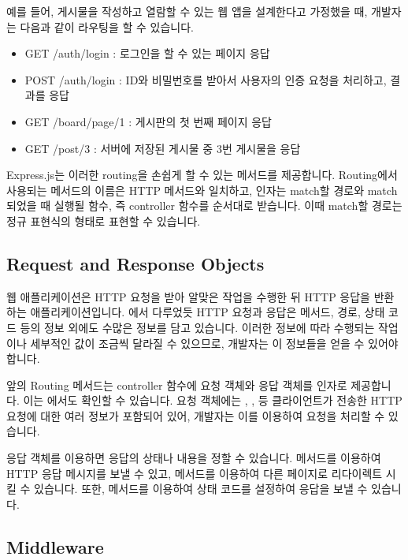 예를 들어, 게시물을 작성하고 열람할 수 있는 웹 앱을 설계한다고 가정했을 때, 개발자는 다음과 같이 라우팅을 할 수 있습니다.

\begin{itemize}
    \item GET /auth/login : 로그인을 할 수 있는 페이지 응답
    \item POST /auth/login : ID와 비밀번호를 받아서 사용자의 인증 요청을 처리하고, 결과를 응답
    \item GET /board/page/1 : 게시판의 첫 번째 페이지 응답
    \item GET /post/3 : 서버에 저장된 게시물 중 3번 게시물을 응답
\end{itemize}

Express.js는 이러한 routing을 손쉽게 할 수 있는 메서드를 제공합니다. Routing에서 사용되는 메서드의 이름은 HTTP 메서드와 일치하고, 인자는 match할 경로와 match 되었을 때 실행될 함수, 즉 controller 함수를 순서대로 받습니다. 이때 match할 경로는 정규 표현식의 형태로 표현할 수 있습니다.

\subsection*{Request and Response Objects}

웹 애플리케이션은 HTTP 요청을 받아 알맞은 작업을 수행한 뒤 HTTP 응답을 반환하는 애플리케이션입니다. 에서 다루었듯 HTTP 요청과 응답은 메서드, 경로, 상태 코드 등의 정보 외에도 수많은 정보를 담고 있습니다. 이러한 정보에 따라 수행되는 작업이나 세부적인 값이 조금씩 달라질 수 있으므로, 개발자는 이 정보들을 얻을 수 있어야 합니다.

앞의 Routing 메서드는 controller 함수에 요청 객체와 응답 객체를 인자로 제공합니다. 이는 에서도 확인할 수 있습니다. 요청 객체에는 , ,  등 클라이언트가 전송한 HTTP 요청에 대한 여러 정보가 포함되어 있어, 개발자는 이를 이용하여 요청을 처리할 수 있습니다.

응답 객체를 이용하면 응답의 상태나 내용을 정할 수 있습니다.  메서드를 이용하여 HTTP 응답 메시지를 보낼 수 있고,  메서드를 이용하여 다른 페이지로 리다이렉트 시킬 수 있습니다. 또한,  메서드를 이용하여 상태 코드를 설정하여 응답을 보낼 수 있습니다.

\subsection*{Middleware}

